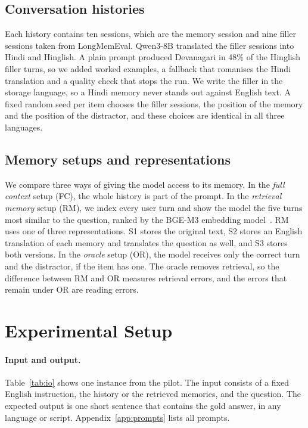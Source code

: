 \documentclass[11pt]{article}
\begin{document}
\subsection{Conversation histories}
Each history contains ten sessions, which are the memory session and nine filler sessions taken from LongMemEval.
Qwen3-8B translated the filler sessions into Hindi and Hinglish.
A plain prompt produced Devanagari in 48\% of the Hinglish filler turns, so we added worked examples, a fallback that romanises the Hindi translation and a quality check that stops the run.
We write the filler in the storage language, so a Hindi memory never stands out against English text.
A fixed random seed per item chooses the filler sessions, the position of the memory and the position of the distractor, and these choices are identical in all three languages.

\subsection{Memory setups and representations}
We compare three ways of giving the model access to its memory.
In the \emph{full context} setup (FC), the whole history is part of the prompt.
In the \emph{retrieval memory} setup (RM), we index every user turn and show the model the five turns most similar to the question, ranked by the BGE-M3 embedding model~\citep{chen2024bgem3}.
RM uses one of three representations.
S1 stores the original text, S2 stores an English translation of each memory and translates the question as well, and S3 stores both versions.
In the \emph{oracle} setup (OR), the model receives only the correct turn and the distractor, if the item has one.
The oracle removes retrieval, so the difference between RM and OR measures retrieval errors, and the errors that remain under OR are reading errors.

\section{Experimental Setup}
\label{sec:setup}

\paragraph{Input and output.}
Table~\ref{tab:io} shows one instance from the pilot.
The input consists of a fixed English instruction, the history or the retrieved memories, and the question.
The expected output is one short sentence that contains the gold answer, in any language or script.
Appendix~\ref{app:prompts} lists all prompts.
\end{document}

